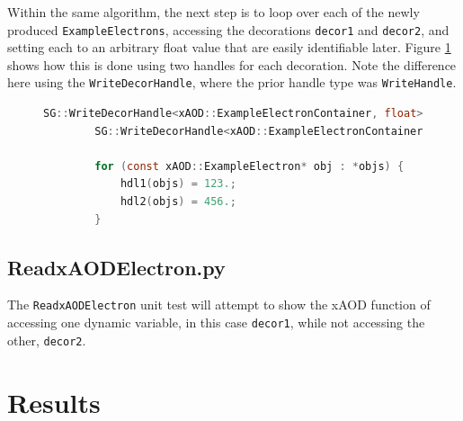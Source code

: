 Within the same algorithm, the next step is to loop over each of the newly produced \verb|ExampleElectrons|, accessing the decorations \verb|decor1| and \verb|decor2|, and setting each to an arbitrary float value that are easily identifiable later.
Figure \ref{fig:Mod_utests_WritexAODElectron2} shows how this is done using two handles for each decoration. 
Note the difference here using the \verb|WriteDecorHandle|, where the prior handle type was \verb|WriteHandle|.
\begin{figure}[h]
    \centering
    \begin{lstlisting}[language=C]
        SG::WriteDecorHandle<xAOD::ExampleElectronContainer, float> hdl1(m_decor1Key,ctx);
        SG::WriteDecorHandle<xAOD::ExampleElectronContainer, float> hdl2(m_decor2Key,ctx);

        for (const xAOD::ExampleElectron* obj : *objs) {
            hdl1(objs) = 123.;
            hdl2(objs) = 456.;
        }
    \end{lstlisting}
    \label{fig:Mod_utests_WritexAODElectron2}
\end{figure}


\subsection{ReadxAODElectron.py}
The \verb|ReadxAODElectron| unit test will attempt to show the xAOD function of accessing one dynamic variable, in this case \verb|decor1|, while not accessing the other, \verb|decor2|.


\section{Results}
